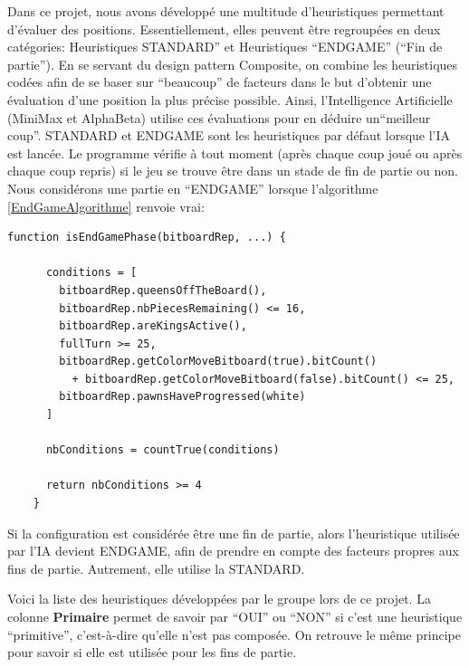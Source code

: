 \documentclass{article}
\begin{document}
Dans ce projet, nous avons développé une multitude d'heuristiques permettant d'évaluer des positions. Essentiellement, elles peuvent être regroupées
en deux catégories: Heuristiques STANDARD'' et Heuristiques ``ENDGAME'' (``Fin de partie''). En se servant du design pattern Composite, on combine les
heuristiques codées afin de se baser sur ``beaucoup'' de facteurs dans le but d'obtenir une évaluation d'une position la plus précise possible. Ainsi,
l'Intelligence Artificielle (MiniMax et AlphaBeta) utilise ces évaluations pour en déduire un``meilleur coup''. STANDARD et ENDGAME sont les 
heuristiques par défaut lorsque l'IA est lancée. Le programme vérifie à tout moment (après chaque coup joué ou après chaque coup repris)
si le jeu se trouve être dans un stade de fin de partie ou non.
Nous considérons une partie en ``ENDGAME'' lorsque l'algorithme \ref{EndGameAlgorithme} renvoie vrai:

\begin{lstlisting}[label={EndGameAlgorithme}, caption={Détection de la phase de fin de partie - pseudo-code}]
    function isEndGamePhase(bitboardRep, ...) {
    
      conditions = [
        bitboardRep.queensOffTheBoard(),
        bitboardRep.nbPiecesRemaining() <= 16,
        bitboardRep.areKingsActive(),
        fullTurn >= 25,
        bitboardRep.getColorMoveBitboard(true).bitCount()
          + bitboardRep.getColorMoveBitboard(false).bitCount() <= 25,
        bitboardRep.pawnsHaveProgressed(white)
      ]
    
      nbConditions = countTrue(conditions)
    
      return nbConditions >= 4
    }
    \end{lstlisting}

Si la configuration est considérée être une fin de partie, alors l'heuristique utilisée
par l'IA devient ENDGAME, afin de prendre en compte des facteurs propres aux fins de partie. Autrement, elle utilise la STANDARD.

Voici la liste des heuristiques développées par le groupe lors de ce projet. La colonne \textbf{Primaire} permet de savoir
par ``OUI'' ou ``NON'' si c'est une heuristique ``primitive'', c'est-à-dire qu'elle n'est pas composée. On retrouve le même principe
pour savoir si elle est utilisée pour les fins de partie.
\end{document}

